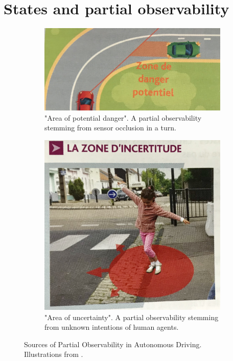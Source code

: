 \section{States and partial observability}

\begin{figure}[tp]
	\centering
	\begin{subfigure}[b]{.7\linewidth}
		\includegraphics[width=\linewidth]{img/po-sensors}
		\caption{"Area of potential danger". A partial observability stemming from sensor occlusion in a turn.}
		\label{fig:po-occlusion}
	\end{subfigure}
	\begin{subfigure}[b]{.4\linewidth}
		\includegraphics[width=\linewidth]{img/po-intentions}
		\caption{"Area of uncertainty". A partial observability stemming from unknown intentions of human agents.}
		\label{fig:po-intentions}
	\end{subfigure}
	\caption{Sources of Partial Observability in Autonomous Driving. Illustrations from \citep{ObjCode2017}.}
	\label{fig:partial-observability}
\end{figure}
